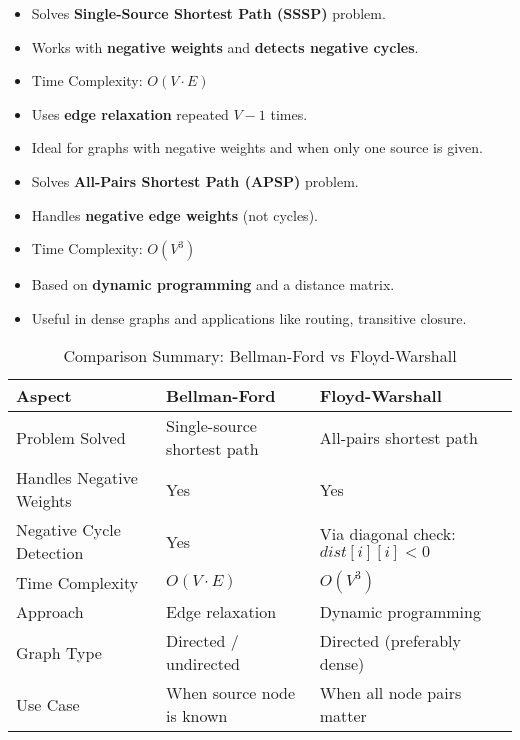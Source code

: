 \documentclass[14pt,a4paper]{extarticle}
\begin{document}
\begin{tcolorbox}[colback=white, colframe=black, title=Bellman-Ford Algorithm Summary]
\begin{itemize}[leftmargin=1.5em]
    \item Solves \textbf{Single-Source Shortest Path (SSSP)} problem.
    \item Works with \textbf{negative weights} and \textbf{detects negative cycles}.
    \item Time Complexity: \( O(V \cdot E) \)
    \item Uses \textbf{edge relaxation} repeated \( V - 1 \) times.
    \item Ideal for graphs with negative weights and when only one source is given.
\end{itemize}
\end{tcolorbox}

\vspace{0.5em}

\begin{tcolorbox}[colback=white, colframe=black, title=Floyd-Warshall Algorithm Summary]
\begin{itemize}[leftmargin=1.5em]
    \item Solves \textbf{All-Pairs Shortest Path (APSP)} problem.
    \item Handles \textbf{negative edge weights} (not cycles).
    \item Time Complexity: \( O(V^3) \)
    \item Based on \textbf{dynamic programming} and a distance matrix.
    \item Useful in dense graphs and applications like routing, transitive closure.
\end{itemize}
\end{tcolorbox}

\vspace{1em}

\begin{table}[H]
\centering
\renewcommand{\arraystretch}{1.3}
\begin{tabular}{|p{5cm}|p{5.5cm}|p{5.5cm}|}
\hline
\textbf{Aspect} & \textbf{Bellman-Ford} & \textbf{Floyd-Warshall} \\
\hline
Problem Solved & Single-source shortest path & All-pairs shortest path \\
\hline
Handles Negative Weights & Yes & Yes \\
\hline
Negative Cycle Detection & Yes & Via diagonal check: \( dist[i][i] < 0 \) \\
\hline
Time Complexity & \( O(V \cdot E) \) & \( O(V^3) \) \\
\hline
Approach & Edge relaxation & Dynamic programming \\
\hline
Graph Type & Directed / undirected & Directed (preferably dense) \\
\hline
Use Case & When source node is known & When all node pairs matter \\
\hline
\end{tabular}
\caption{Comparison Summary: Bellman-Ford vs Floyd-Warshall}
\end{table}
\end{document}
